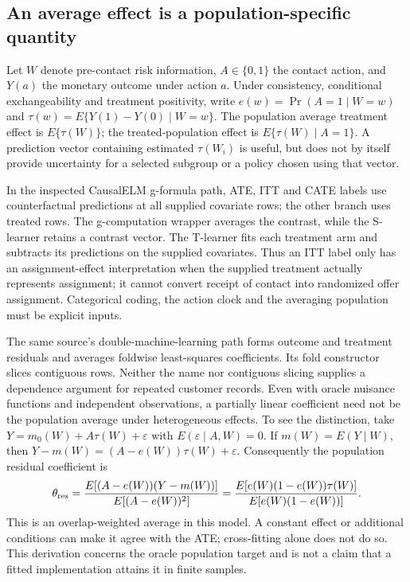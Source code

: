 \subsection{An average effect is a population-specific quantity}
\label{exec21:effects-target}

Let $W$ denote pre-contact risk information, $A\in\{0,1\}$ the contact action,
and $Y(a)$ the monetary outcome under action $a$. Under consistency,
conditional exchangeability and treatment positivity, write
$e(w)=\Pr(A=1\mid W=w)$ and
$\tau(w)=E\{Y(1)-Y(0)\mid W=w\}$. The population average treatment effect is
$E\{\tau(W)\}$; the treated-population effect is
$E\{\tau(W)\mid A=1\}$. A prediction vector containing estimated
$\tau(W_i)$ is useful, but does not by itself provide uncertainty for a
selected subgroup or a policy chosen using that vector.

In the inspected CausalELM g-formula path, ATE, ITT and CATE labels use
counterfactual predictions at all supplied covariate rows; the other branch
uses treated rows. The g-computation wrapper averages the contrast, while the
S-learner retains a contrast vector. The T-learner fits each treatment arm and
subtracts its predictions on the supplied covariates. Thus an ITT label only
has an assignment-effect interpretation when the supplied treatment actually
represents assignment; it cannot convert receipt of contact into randomized
offer assignment. Categorical coding, the action clock and the averaging
population must be explicit inputs. \citep{exec21_effects_causalelm}

The same source's double-machine-learning path forms outcome and treatment
residuals and averages foldwise least-squares coefficients. Its fold
constructor slices contiguous rows. Neither the name nor contiguous slicing
supplies a dependence argument for repeated customer records. Even with
oracle nuisance functions and independent observations, a partially linear
coefficient need not be the population average under heterogeneous effects.
To see the distinction, take
$Y=m_0(W)+A\tau(W)+\varepsilon$ with
$E(\varepsilon\mid A,W)=0$. If $m(W)=E(Y\mid W)$, then
$Y-m(W)=(A-e(W))\tau(W)+\varepsilon$. Consequently the population residual
coefficient is
\begin{equation}
\label{exec21:effects-residual}
 \theta_{\rm res}
 =\frac{E[(A-e(W))(Y-m(W))]}{E[(A-e(W))^2]}
 =\frac{E[e(W)(1-e(W))\tau(W)]}{E[e(W)(1-e(W))]}.
\end{equation}
This is an overlap-weighted average in this model. A constant effect or
additional conditions can make it agree with the ATE; cross-fitting alone
does not do so. This derivation concerns the oracle population target and is
not a claim that a fitted implementation attains it in finite samples.
\citep{exec21_effects_causalelm,exec21_effects_reference}

